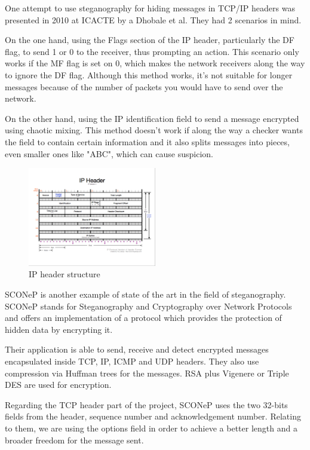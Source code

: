
One attempt to use steganography for hiding messages in TCP/IP headers was
presented in 2010 at ICACTE by a Dhobale et al\cite{stegano-hiding-data}. They had 2
scenarios in mind.

On the one hand, using the Flags section of the IP header, particularly the DF flag, to send
1 or 0 to the receiver, thus prompting an action. This scenario only works if
the MF flag is set on 0, which makes the network receivers along the way to
ignore the DF flag. Although this method works, it's not suitable for longer
messages because of the number of packets you would have to send over the
network.

On the other hand, using the IP identification field to send a message encrypted using chaotic
mixing. This method doesn't work if along the way a checker wants the field to
contain certain information and it also splits messages into pieces, even
smaller ones like "ABC", which can cause suspicion.

\begin{figure}
  \centering
  \includegraphics[width=0.5\textwidth]{img/IPHeader}
  \caption{IP header structure}
  \label{fig:related}
\end{figure}

SCONeP\cite{ciobanu2011sconep} is another example of state of the art in the
field of steganography. SCONeP stands for Steganography and Cryptography over
Network Protocols and offers an implementation of a protocol which provides
the protection of hidden data by encrypting it.

Their application is able to send, receive and detect encrypted messages
encapsulated inside TCP, IP, ICMP and UDP headers. They also use compression
via Huffman trees for the messages. RSA plus Vigenere or Triple DES are used
for encryption.

Regarding the TCP header part of the project, SCONeP uses the two 32-bits
fields from the header, sequence number and acknowledgement number. Relating
to them, we are using the options field in order to achieve a better length
and a broader freedom for the message sent.

